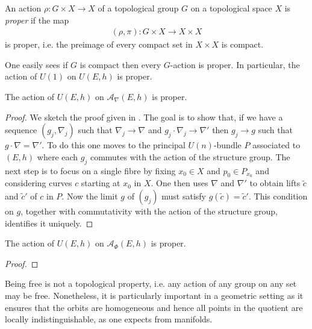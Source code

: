 \documentclass[12pt]{ociamthesis}  %
\begin{document}
\begin{definition}
  An action $\rho : G\times X\to X$ of a topological group $G$
  on a topological space $X$ is \emph{proper} if the map
  \begin{align}\label{eq:proper_map}
    (\rho,\pi) : G\times X \to X\times X
  \end{align}
  is proper, i.e. the preimage of every compact set in $X\times X$
  is compact.
\end{definition}

\begin{example}
  One easily sees if $G$ is compact then every $G$-action is proper.
  In particular, the action of $U(1)$ on $U(E,h)$ is
  proper.
\end{example}

\begin{example}\label{ex:h_proper_action}
  The action of $U(E,h)$ on $\mathcal A_\nabla(E,h)$ is proper.
  \begin{proof}
    We sketch the proof given in
    \cite[{Proposition 7.1.14}]{kobayashi1987}.
    The goal is to show that, if we have a sequence $(g_j,\nabla_j)$
    such that $\nabla_j\to\nabla$ and $g_j\cdot\nabla_j\to\nabla'$
    then $g_j\to g$ such that $g\cdot\nabla = \nabla'$. To do this
    one moves to the principal $U(n)$-bundle $P$ associated to $(E,h)$
    where each $g_j$ commutes with the action of the structure
    group. The next step is to focus on a single fibre by fixing $x_0\in X$ and
    $p_0\in P_{x_0}$ and considering curves $c$ starting at $x_0$ in $X$.
    One then uses $\nabla$ and $\nabla'$ to obtain lifts $\tilde c$ and
    $\tilde c'$ of $c$ in $P$. Now the limit $g$ of $(g_j)$ must satisfy
    $g(\tilde c) = \tilde c'$. This condition on $g$, together with
    commutativity with the action of the structure group, identifies it
    uniquely.
  \end{proof}
\end{example}

\begin{example}\label{ex:higgs_proper_action}
  The action of $U(E,h)$ on $\mathcal A_\Phi (E,h)$ is proper.
  \begin{proof}
    \missingproof
  \end{proof}
\end{example}

Being free is not a topological property, i.e. any action of any group on any
set may be free. Nonetheless, it is particularly important in a geometric
setting as it ensures that the orbits are homogeneous and hence all points in
the quotient are locally indistinguishable, as one expects from manifolds.
\end{document}
